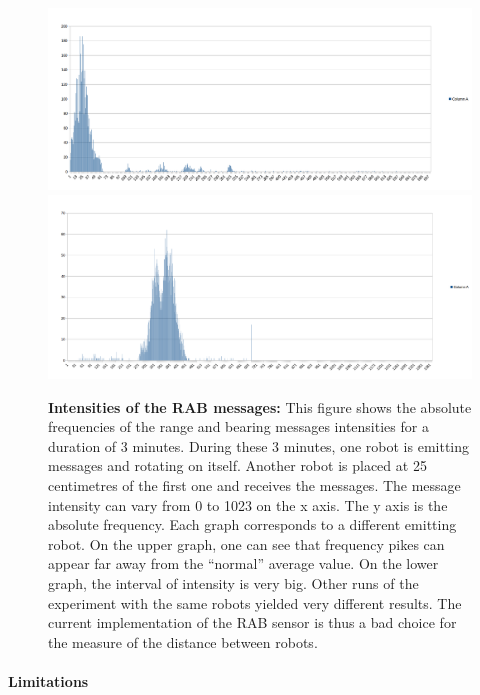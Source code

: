 \documentclass[oneside, a4paper, 12pt]{memoir}
\let\oldCaption\caption
\renewcommand{\caption}[2]{
\oldCaption[#1]{{\small\sffamily\bfseries #1:} #2}
}
\begin{document}
		\begin{figure}[!htp]
			\includegraphics[trim=35px 0px 100px 0px, clip=true, width=\textwidth]{images/powers_29-28.png}
			\includegraphics[trim=35px 20px 100px 0px, clip=true, width=\textwidth]{images/powers_54-28.png}
			\caption{Intensities of the RAB messages}{This figure shows the absolute frequencies of the range and bearing messages intensities for a duration of 3 minutes. During these 3 minutes, one robot is emitting messages and rotating on itself. Another robot is placed at 25 centimetres of the first one and receives the messages. The message intensity can vary from 0 to 1023 on the x axis. The y axis is the absolute frequency. Each graph corresponds to a different emitting robot. On the upper graph, one can see that frequency pikes can appear far away from the \enquote{normal} average value. On the lower graph, the interval of intensity is very big. Other runs of the experiment with the same robots yielded very different results. The current implementation of the RAB sensor is thus a bad choice for the measure of the distance between robots.}
			\label{fig:rab_intensities}
		\end{figure}
		
		\paragraph{Limitations}
		
\end{document}

